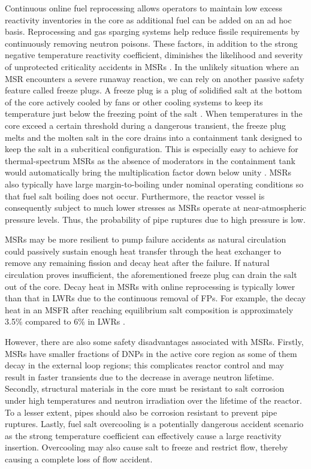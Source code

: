 Continuous online fuel reprocessing allows operators to maintain low excess
reactivity inventories in the core as additional fuel can be added on an ad
hoc basis. Reprocessing and gas sparging systems help reduce fissile
requirements by continuously removing neutron poisons. These factors, in
addition to the strong negative temperature
reactivity coefficient, diminishes the likelihood and severity of unprotected
criticality accidents in \glspl{MSR} \cite{elsheikh_safety_2013}. In the
unlikely situation where an \gls{MSR} encounters a severe runaway reaction,
we can rely on another passive safety feature called freeze plugs. A freeze
plug is a plug of solidified salt at the bottom of the core actively cooled by
fans or other cooling systems to keep its temperature just below the freezing
point of the salt \cite{aji_experimental_2020}. When temperatures in the core
exceed a certain threshold during a dangerous transient, the freeze plug melts
and the molten salt in the core drains into a containment tank designed to
keep the salt in a subcritical configuration. This is especially easy to
achieve for
thermal-spectrum \glspl{MSR} as the absence of moderators in the containment
tank would automatically bring the multiplication factor down below unity
\cite{elsheikh_safety_2013}. \glspl{MSR} also typically have large
margin-to-boiling under nominal operating conditions so that fuel salt boiling
does not occur. Furthermore, the reactor vessel is consequently subject to
much lower stresses as \glspl{MSR} operate at near-atmospheric pressure
levels. Thus, the probability of pipe ruptures due to high pressure is low.

\glspl{MSR} may be more resilient to pump failure accidents as natural
circulation could passively sustain enough heat transfer through the heat
exchanger to remove any remaining fission and decay heat after the failure. If
natural circulation proves insufficient, the aforementioned freeze plug can
drain the salt out of the core. Decay heat in \glspl{MSR} with online
reprocessing is typically lower than that in \glspl{LWR} due to the
continuous removal of \glspl{FP}. For example, the decay heat in an \gls{MSFR}
after reaching equilibrium salt composition is approximately 3.5\% compared
to 6\% in \glspl{LWR} \cite{brovchenko_design-related_2013}.

However, there are also some safety disadvantages associated with \glspl{MSR}.
Firstly, \glspl{MSR} have smaller fractions of \glspl{DNP} in the active core
region as some of them decay in the external loop regions; this complicates
reactor control and may result in faster transients due to the decrease in
average neutron lifetime. Secondly, structural materials in the core must be
resistant to salt corrosion under high temperatures and neutron irradiation
over the lifetime of the reactor. To a lesser extent, pipes should also be
corrosion resistant to prevent pipe ruptures. Lastly, fuel salt overcooling is
a potentially dangerous accident scenario as the strong temperature
coefficient can effectively cause a large reactivity insertion. Overcooling
may also cause salt to freeze and restrict flow, thereby causing a complete
loss of flow accident.


